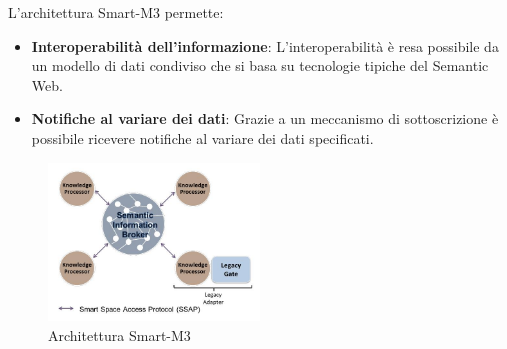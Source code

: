 L'architettura Smart-M3 permette:

\begin{itemize}
	\item \textbf{Interoperabilità dell'informazione}: L'interoperabilità è resa possibile da un modello di dati condiviso che si basa su tecnologie tipiche del Semantic Web.
	\item \textbf{Notifiche al variare dei dati}: Grazie a un meccanismo di sottoscrizione è possibile ricevere notifiche al variare dei dati specificati.
\end{itemize}

\begin{figure}[H]
	\centering
	\includegraphics[width=0.5\textwidth]{assets/smart-m3.jpg}
	\caption{Architettura Smart-M3}
	\label{fig:smart-m3}
\end{figure}
